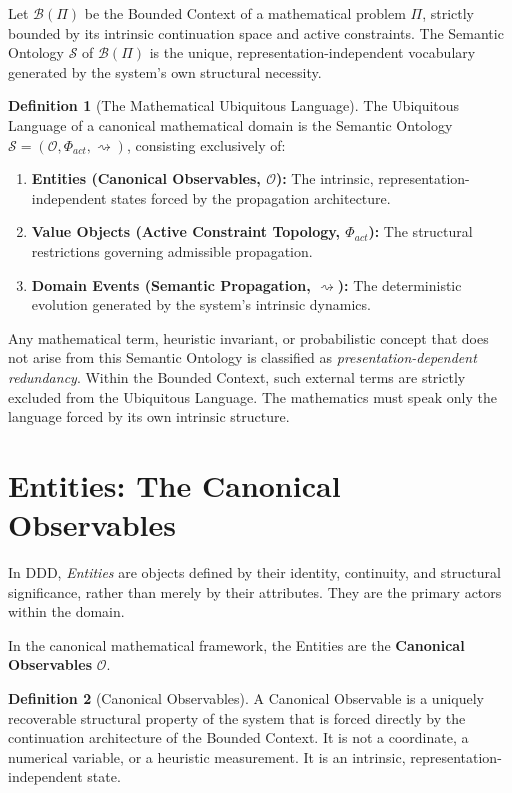 \documentclass[12pt,openany]{extbook}
\theoremstyle{plain}
\theoremstyle{definition}
\newtheorem{definition}{Definition}[chapter]
\begin{document}
Let $\mathcal{B}(\Pi)$ be the Bounded Context of a mathematical problem $\Pi$, strictly bounded by its intrinsic continuation space and active constraints. The Semantic Ontology $\mathcal{S}$ of $\mathcal{B}(\Pi)$ is the unique, representation-independent vocabulary generated by the system's own structural necessity.

\begin{definition}[The Mathematical Ubiquitous Language]
The Ubiquitous Language of a canonical mathematical domain is the Semantic Ontology $\mathcal{S} = (\mathcal{O}, \Phi_{act}, \rightsquigarrow)$, consisting exclusively of:
\begin{enumerate}
    \item \textbf{Entities (Canonical Observables, $\mathcal{O}$):} The intrinsic, representation-independent states forced by the propagation architecture.
    \item \textbf{Value Objects (Active Constraint Topology, $\Phi_{act}$):} The structural restrictions governing admissible propagation.
    \item \textbf{Domain Events (Semantic Propagation, $\rightsquigarrow$):} The deterministic evolution generated by the system's intrinsic dynamics.
\end{enumerate}
\end{definition}

Any mathematical term, heuristic invariant, or probabilistic concept that does not arise from this Semantic Ontology is classified as \emph{presentation-dependent redundancy}. Within the Bounded Context, such external terms are strictly excluded from the Ubiquitous Language. The mathematics must speak only the language forced by its own intrinsic structure.

\section{Entities: The Canonical Observables}

In DDD, \emph{Entities} are objects defined by their identity, continuity, and structural significance, rather than merely by their attributes. They are the primary actors within the domain.

In the canonical mathematical framework, the Entities are the \textbf{Canonical Observables} $\mathcal{O}$. 

\begin{definition}[Canonical Observables]
A Canonical Observable is a uniquely recoverable structural property of the system that is forced directly by the continuation architecture of the Bounded Context. It is not a coordinate, a numerical variable, or a heuristic measurement. It is an intrinsic, representation-independent state.
\end{definition}
\end{document}
